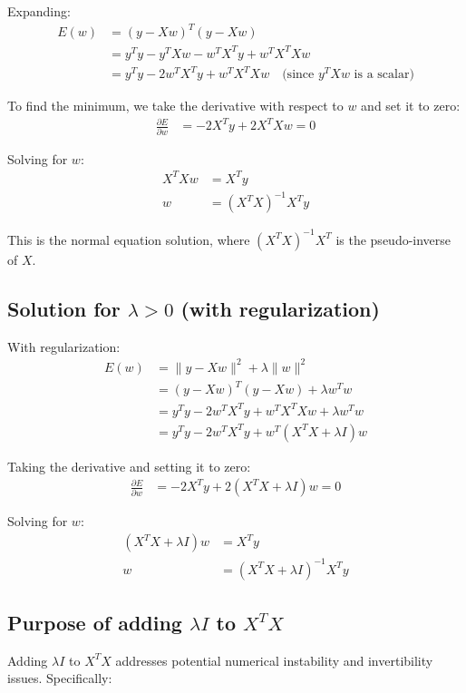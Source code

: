 \documentclass{article}
\begin{document}
Expanding:
\begin{align}
E(w) &= (y - Xw)^T(y - Xw) \\
&= y^Ty - y^TXw - w^TX^Ty + w^TX^TXw \\
&= y^Ty - 2w^TX^Ty + w^TX^TXw \quad \text{(since $y^TXw$ is a scalar)}
\end{align}

To find the minimum, we take the derivative with respect to $w$ and set it to zero:
\begin{align}
\frac{\partial E}{\partial w} &= -2X^Ty + 2X^TXw = 0
\end{align}

Solving for $w$:
\begin{align}
X^TXw &= X^Ty \\
w &= (X^TX)^{-1}X^Ty
\end{align}

This is the normal equation solution, where $(X^TX)^{-1}X^T$ is the pseudo-inverse of $X$.

\subsection{Solution for $\lambda > 0$ (with regularization)}
With regularization:
\begin{align}
E(w) &= \|y - Xw\|^2 + \lambda\|w\|^2 \\
&= (y - Xw)^T(y - Xw) + \lambda w^Tw \\
&= y^Ty - 2w^TX^Ty + w^TX^TXw + \lambda w^Tw \\
&= y^Ty - 2w^TX^Ty + w^T(X^TX + \lambda I)w
\end{align}

Taking the derivative and setting it to zero:
\begin{align}
\frac{\partial E}{\partial w} &= -2X^Ty + 2(X^TX + \lambda I)w = 0
\end{align}

Solving for $w$:
\begin{align}
(X^TX + \lambda I)w &= X^Ty \\
w &= (X^TX + \lambda I)^{-1}X^Ty
\end{align}

\subsection{Purpose of adding $\lambda I$ to $X^TX$}
Adding $\lambda I$ to $X^TX$ addresses potential numerical instability and invertibility issues. Specifically:
\end{document}
